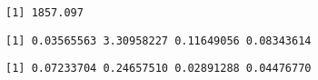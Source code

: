 \documentclass[]{book}
\newenvironment{Shaded}{\begin{snugshade}}{\end{snugshade}}
\newcommand{\KeywordTok}[1]{\textcolor[rgb]{0.13,0.29,0.53}{\textbf{#1}}}
\newcommand{\NormalTok}[1]{#1}
\newcommand{\OperatorTok}[1]{\textcolor[rgb]{0.81,0.36,0.00}{\textbf{#1}}}
\begin{document}
\begin{verbatim}
[1] 1857.097
\end{verbatim}

\begin{Shaded}
\end{Shaded}

\begin{verbatim}
[1] 0.03565563 3.30958227 0.11649056 0.08343614
\end{verbatim}

\begin{Shaded}
\end{Shaded}

\begin{verbatim}
[1] 0.07233704 0.24657510 0.02891288 0.04476770
\end{verbatim}
\end{document}
